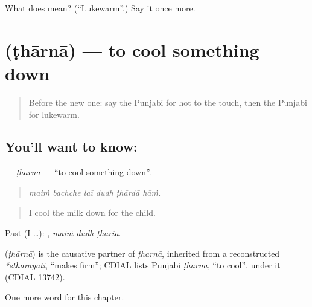 \begin{tcolorbox}[breakable,colback=teal!4,colframe=teal!35!black,title={Before you move on}]
What does  mean? (\textquotedblleft{}Lukewarm\textquotedblright{}.) Say it once more.
\end{tcolorbox}
\section[\texorpdfstring{\pa{ਠਾਰਨਾ} (ṭhārnā)}{ਠਾਰਨਾ (ṭhārnā)}]{ (ṭhārnā) — to cool something down}

\label{lesson:PA-C291-thaarna}



\begin{quote}
Before the new one: say the Punjabi for hot to the touch, then the Punjabi for lukewarm.
\end{quote}

\subsection*{You'll want to know: }
\textbf{} — \emph{ṭhārnā} — \textquotedblleft{}to cool something down\textquotedblright{}.

\begin{quote}
     
\end{quote}

\begin{quote}
\emph{maiṁ bachche laī dudh ṭhārdā hāṁ.}
\end{quote}

\begin{quote}
I cool the milk down for the child.
\end{quote}

Past (I …):   , \emph{maiṁ dudh ṭhāriā}.

\begin{cousinweb}
\textbf{} (\emph{ṭhārnā}) is the causative partner of \emph{ṭharnā}, inherited from a reconstructed \emph{*sthārayati}, \textquotedblleft{}makes firm\textquotedblright{}; CDIAL lists Punjabi \emph{ṭhārnā}, \textquotedblleft{}to cool\textquotedblright{}, under it (CDIAL 13742).
\end{cousinweb}

\begin{grammarlens}[title={What you've built}]
One more word for this chapter.
\end{grammarlens}

